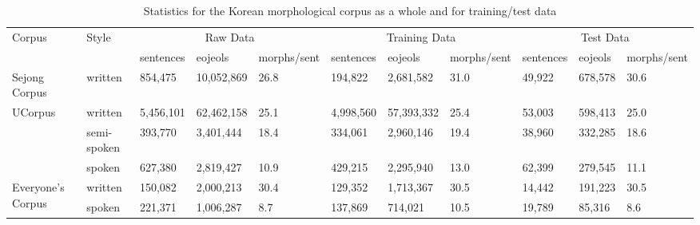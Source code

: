 \documentclass[AMS,STIX2COL]{WileyNJD-v2}
\begin{document}
    \begin{table}[ht]
        \centering
        \footnotesize
        \caption{Statistics for the Korean morphological corpus as a whole and for training/test data}
        \label{tab:data-statistics}
        \begin{tabular}{m{20mm}m{14mm}m{10mm}m{12mm}m{10mm}m{10mm}m{12mm}m{10mm}m{10mm}m{12mm}m{10mm}}
            \toprule
            \multirow{2}{*}{Corpus}            & \multirow{2}{*}{Style} & \multicolumn{3}{c}{Raw Data}                 & \multicolumn{3}{c}{Training Data}            & \multicolumn{3}{c}{Test Data}             \\
            \cmidrule(lr){3-5} \cmidrule(lr){6-8} \cmidrule(lr){9-11}
            ~                                  & ~                      & sentences & eojeols    & morphs\newline/sent & sentences & eojeols    & morphs\newline/sent & sentences & eojeols & morphs\newline/sent \\
            \midrule
            Sejong Corpus                      & written                & 854,475   & 10,052,869 & 26.8                & 194,822   & 2,681,582  & 31.0                & 49,922    & 678,578 & 30.6                \\
            \midrule
            \multirow{3}{*}{UCorpus}           & written                & 5,456,101 & 62,462,158 & 25.1                & 4,998,560 & 57,393,332 & 25.4                & 53,003    & 598,413 & 25.0                \\
            ~                                  & semi-spoken            & 393,770   & 3,401,444  & 18.4                & 334,061   & 2,960,146  & 19.4                & 38,960    & 332,285 & 18.6                \\
            ~                                  & spoken                 & 627,380   & 2,819,427  & 10.9                & 429,215   & 2,295,940  & 13.0                & 62,399    & 279,545 & 11.1                \\
            \midrule
            \multirow{2}{*}{Everyone's Corpus} & written                & 150,082   & 2,000,213  & 30.4                & 129,352   & 1,713,367  & 30.5                & 14,442    & 191,223 & 30.5                \\
            ~                                  & spoken                 & 221,371   & 1,006,287  & 8.7                 & 137,869   & 714,021    & 10.5                & 19,789    & 85,316  & 8.6                 \\
            \bottomrule
        \end{tabular}
    \end{table}
\end{document}
